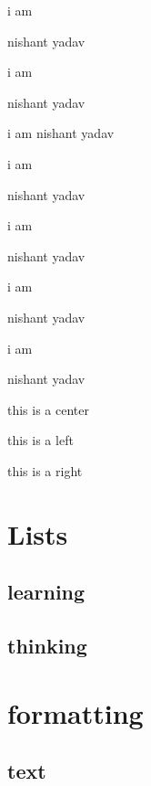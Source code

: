 \documentclass[]{article}
\begin{document}
i am \begin{huge} nishant yadav \end{huge}

i am \begin{Huge} nishant yadav \end{Huge}

i am nishant yadav

i am \begin{normalsize} nishant yadav \end{normalsize}

i am \begin{small} nishant yadav \end{small}

i am \begin{scriptsize} nishant yadav \end{scriptsize}

i am \begin{tiny} nishant yadav \end{tiny}

\vspace{2cm}

\begin{center} this is a center \end{center}

\begin{flushleft} this is a left \end{flushleft}

\begin{flushright} this is a right \end{flushright}

\vspace{2cm}


\section{Lists}
 \subsection{learning}
 \subsection{thinking}
\section{formatting}
 \subsection{text}
\end{document}
